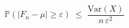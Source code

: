 \documentclass[preview]{standalone}
\begin{document}
\begin{align*}
\mathbb{P}\!\left(|F_n - \mu| \geq \varepsilon\right) \;\leq\; \dfrac{\mathrm{Var}(X)}{n\,\varepsilon^2}
\end{align*}
\end{document}
